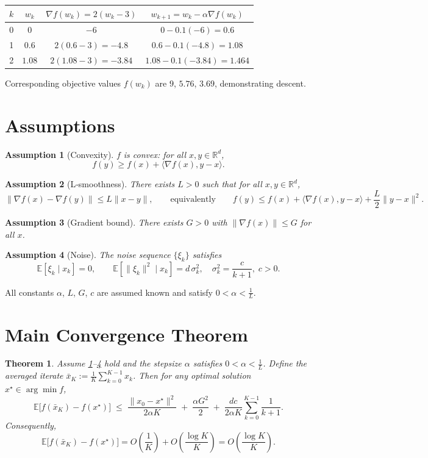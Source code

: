 \documentclass{article}
\newtheorem{theorem}{Theorem}
\newtheorem{assumption}{Assumption}
\begin{document}
\begin{center}
\begin{tabular}{c|c|c|c}
$k$ & $w_k$ & $\nabla f(w_k)=2(w_k-3)$ & $w_{k+1}=w_k-\alpha\nabla f(w_k)$ \\ \hline
0 & $0$ & $-6$ & $0-0.1(-6)=0.6$ \\
1 & $0.6$ & $2(0.6-3)=-4.8$ & $0.6-0.1(-4.8)=1.08$ \\
2 & $1.08$ & $2(1.08-3)=-3.84$ & $1.08-0.1(-3.84)=1.464$ \\
\end{tabular}
\end{center}
Corresponding objective values $f(w_k)$ are $9$, $5.76$, $3.69$, demonstrating descent.

\section*{Assumptions}
\begin{assumption}[Convexity]\label{as:convex}
$f$ is convex: for all $x,y\in\mathbb{R}^{d}$,
\[
f(y)\ge f(x)+\langle\nabla f(x),y-x\rangle .
\]
\end{assumption}
\begin{assumption}[L‑smoothness]\label{as:smooth}
There exists $L>0$ such that for all $x,y\in\mathbb{R}^{d}$,
\[
\|\nabla f(x)-\nabla f(y)\|\le L\|x-y\|,
\qquad\text{equivalently}\qquad
f(y)\le f(x)+\langle\nabla f(x),y-x\rangle+\frac{L}{2}\|y-x\|^{2}.
\]
\end{assumption}
\begin{assumption}[Gradient bound]\label{as:gradbound}
There exists $G>0$ with $\|\nabla f(x)\|\le G$ for all $x$.
\end{assumption}
\begin{assumption}[Noise]\label{as:noise}
The noise sequence $\{\xi_k\}$ satisfies
\[
\mathbb{E}[\xi_k\mid x_k]=0,\qquad
\mathbb{E}\!\left[\|\xi_k\|^{2}\mid x_k\right]=d\,\sigma_k^{2},
\quad\sigma_k^{2}=\frac{c}{k+1},\;c>0.
\]
\end{assumption}
All constants $\alpha$, $L$, $G$, $c$ are assumed known and satisfy $0<\alpha<\frac{1}{L}$.

\section*{Main Convergence Theorem}
\begin{theorem}\label{thm:convergence}
Assume \ref{as:convex}–\ref{as:noise} hold and the stepsize $\alpha$ satisfies $0<\alpha<\frac{1}{L}$.  
Define the averaged iterate $\bar x_{K}:=\frac{1}{K}\sum_{k=0}^{K-1}x_k$.  
Then for any optimal solution $x^{\star}\in\arg\min f$,
\[
\mathbb{E}\!\big[f(\bar x_{K})-f(x^{\star})\big]
\;\le\;
\frac{\|x_{0}-x^{\star}\|^{2}}{2\alpha K}
\;+\;
\frac{\alpha G^{2}}{2}
\;+\;
\frac{d c}{2\alpha K}\sum_{k=0}^{K-1}\frac{1}{k+1}.
\]
Consequently,
\[
\mathbb{E}\!\big[f(\bar x_{K})-f(x^{\star})\big]=
O\!\left(\frac{1}{K}\right)+O\!\left(\frac{\log K}{K}\right)
=O\!\left(\frac{\log K}{K}\right).
\]
\end{theorem}
\end{document}
